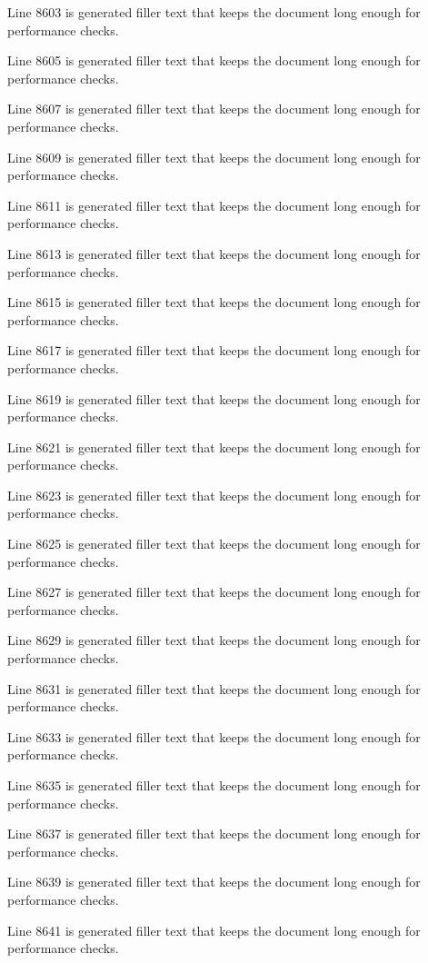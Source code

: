 Line 8603 is generated filler text that keeps the document long enough for performance checks.

Line 8605 is generated filler text that keeps the document long enough for performance checks.

Line 8607 is generated filler text that keeps the document long enough for performance checks.

Line 8609 is generated filler text that keeps the document long enough for performance checks.

Line 8611 is generated filler text that keeps the document long enough for performance checks.

Line 8613 is generated filler text that keeps the document long enough for performance checks.

Line 8615 is generated filler text that keeps the document long enough for performance checks.

Line 8617 is generated filler text that keeps the document long enough for performance checks.

Line 8619 is generated filler text that keeps the document long enough for performance checks.

Line 8621 is generated filler text that keeps the document long enough for performance checks.

Line 8623 is generated filler text that keeps the document long enough for performance checks.

Line 8625 is generated filler text that keeps the document long enough for performance checks.

Line 8627 is generated filler text that keeps the document long enough for performance checks.

Line 8629 is generated filler text that keeps the document long enough for performance checks.

Line 8631 is generated filler text that keeps the document long enough for performance checks.

Line 8633 is generated filler text that keeps the document long enough for performance checks.

Line 8635 is generated filler text that keeps the document long enough for performance checks.

Line 8637 is generated filler text that keeps the document long enough for performance checks.

Line 8639 is generated filler text that keeps the document long enough for performance checks.

Line 8641 is generated filler text that keeps the document long enough for performance checks.

